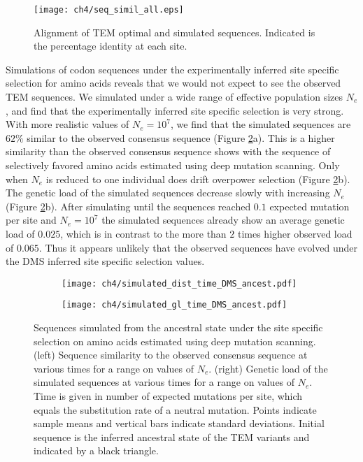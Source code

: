 \singlespacing
\begin{figure}[H]
     \centering
	\texttt{[image: ch4/seq\_simil\_all.eps]}
	\caption{Alignment of TEM optimal and simulated sequences. Indicated is the percentage identity at each site.}
	\label{fig:sim_seqs_cons}
\end{figure}
\doublespacing

Simulations of codon sequences under the experimentally inferred site specific selection for amino acids reveals that we would not expect to see the observed TEM sequences.
We simulated under a wide range of effective population sizes $N_e$, and find that the experimentally inferred site specific selection is very strong.
With more realistic values of $N_e = 10^7$, we find that the simulated sequences are $62 \%$ similar to the observed consensus sequence (Figure \ref{fig:dms_sim}a).
This is a higher similarity than the observed consensus sequence shows with the sequence of selectively favored amino acids estimated using deep mutation scanning.
Only when $N_e$ is reduced to one individual does drift overpower selection (Figure \ref{fig:dms_sim}b).
The genetic load of the simulated sequences decrease slowly with increasing $N_e$ (Figure \ref{fig:dms_sim}b).
After simulating until the sequences reached $0.1$ expected mutation per site and $N_e = 10^7$ the simulated sequences already show an average genetic load of $0.025$, which is in contrast to the more than $2$ times higher observed load of $0.065$.
Thus it appears unlikely that the observed sequences have evolved under the DMS inferred site specific selection values.


\begin{figure}[h]
    \centering
    \begin{subfigure}
        \centering
        \texttt{[image: ch4/simulated\_dist\_time\_DMS\_ancest.pdf]}
    \end{subfigure}
    \begin{subfigure}
        \centering
        \texttt{[image: ch4/simulated\_gl\_time\_DMS\_ancest.pdf]}
    \end{subfigure}
    \caption{Sequences simulated from the ancestral state under the site specific selection on amino acids estimated using deep mutation scanning. 
    (left) Sequence similarity to the observed consensus sequence at various times for a range on values of $N_e$.
    (right) Genetic load of the simulated sequences at various times for a range on values of $N_e$.
    Time is given in number of expected mutations per site, which equals the substitution rate of a neutral mutation.
    Points indicate sample means and vertical bars indicate standard deviations. Initial sequence is the inferred ancestral state of the TEM variants and indicated by a black triangle.}
    \label{fig:dms_sim}
\end{figure}

